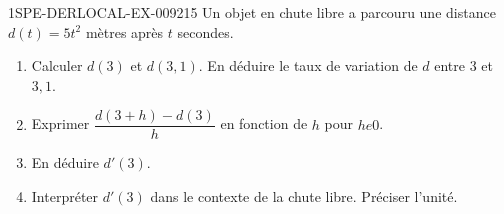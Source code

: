 \begin{exercice}{1SPE-DERLOCAL-EX-009}{2}{15}
Un objet en chute libre a parcouru une distance $d(t)=5t^2$ mètres après $t$ secondes.

\begin{enumerate}
  \item Calculer $d(3)$ et $d(3{,}1)$. En déduire le taux de variation de $d$ entre $3$ et $3{,}1$.
  \item Exprimer $\dfrac{d(3+h)-d(3)}{h}$ en fonction de $h$ pour $h
e 0$.
  \item En déduire $d'(3)$.
  \item Interpréter $d'(3)$ dans le contexte de la chute libre. Préciser l'unité.
\end{enumerate}
\end{exercice}
